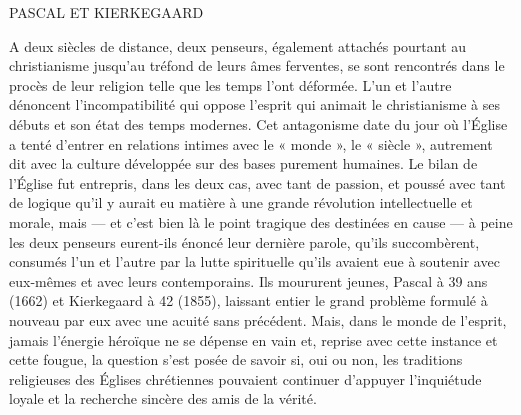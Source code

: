 \documentclass[12pt,a4paper]{article}
\newcommand{\opage}[1]{\marginnote{\footnotesize\textit{[#1]}}}
\begin{document}
\begin{center}
  {\Large PASCAL ET KIERKEGAARD}\\[1ex]
\end{center}

\bigskip


\opage{221} %

A deux siècles de distance, deux penseurs, également attachés
pourtant au christianisme jusqu'au tréfond de leurs âmes ferventes,
se sont rencontrés dans le procès de leur religion telle que les temps
l'ont déformée. L'un et l'autre dénoncent l'incompatibilité qui
oppose l'esprit qui animait le christianisme à ses débuts et son état
des temps modernes. Cet antagonisme date du jour où l'Église a
tenté d'entrer en relations intimes avec le « monde », le « siècle »,
autrement dit avec la culture développée sur des bases purement
humaines. Le bilan de l'Église fut entrepris, dans les deux cas, avec
tant de passion, et poussé avec tant de logique qu'il y aurait eu
matière à une grande révolution intellectuelle et morale, mais ---
et c'est bien là le point tragique des destinées en cause --- à peine
les deux penseurs eurent-ils énoncé leur dernière parole, qu'ils
succombèrent, consumés l'un et l'autre par la lutte spirituelle qu'ils
avaient eue à soutenir avec eux-mêmes et avec leurs contemporains.
Ils moururent jeunes, Pascal à 39 ans (1662) et Kierkegaard à 42
(1855), laissant entier le grand problème formulé à nouveau par
eux avec une acuité sans précédent. Mais, dans le monde de l'esprit,
jamais l'énergie héroïque ne se dépense en vain et, reprise avec
cette instance et cette fougue, la question s'est posée de savoir si,
oui ou non, les traditions religieuses des Églises chrétiennes pouvaient
continuer d'appuyer l'inquiétude loyale et la recherche sincère
des amis de la vérité.
\end{document}

